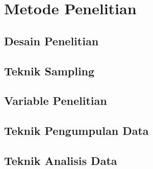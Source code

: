 \chapter{Metode Penelitian}
\section{Desain Penelitian}
\section{Teknik Sampling}
\section{Variable Penelitian}
\section{Teknik Pengumpulan Data}
\section{Teknik Analisis Data}